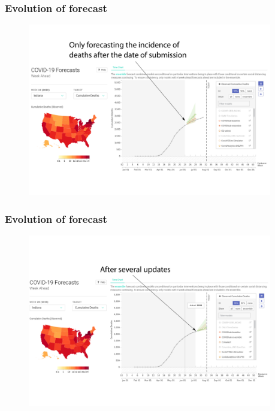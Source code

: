 \documentclass[usenames,dvipsnames]{beamer}
\begin{document}
\begin{frame}
  \frametitle{Evolution of forecast}
    \begin{figure}
    \includegraphics[width=0.95\textwidth]{./images/FRED_forecast_up_6.png}
  \end{figure}
\end{frame}

\begin{frame}
  \frametitle{Evolution of forecast}
  \begin{figure}
    \includegraphics[width=0.95\textwidth]{./images/FRED_forecast_up_7.png}
  \end{figure}
\end{frame}

\end{document}
